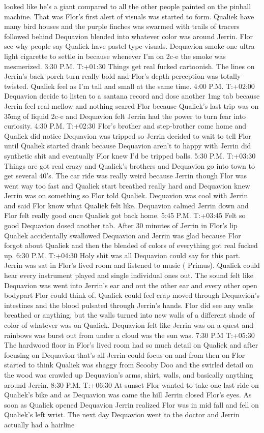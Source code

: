 \documentclass[12pt]{book}
\begin{document}
looked like he's a giant compared to all the other people painted on the pinball machine. That was Flor's first alert of visuals was started to form. Qualiek have many bird houses and the purple finches was swarmed with trails of tracers followed behind Dequavion blended into whatever color was around Jerrin. Flor see why people say Qualiek have pastel type visuals. Dequavion smoke one ultra light cigarette to settle in because whenever I'm on 2c-e the smoke was mesmerized. 3:30 P.M. T:+01:30 Things get real fucked cartoonish. The lines on Jerrin's back porch turn really bold and Flor's depth perception was totally twisted. Qualiek feel as I'm tall and small at the same time. 4:00 P.M. T:+02:00 Dequavion decide to listen to a santana record and dose another 1mg tab because Jerrin feel real mellow and nothing scared Flor because Qualiek's last trip was on 35mg of liquid 2c-e and Dequavion felt Jerrin had the power to turn fear into curiosity. 4:30 P.M. T:+02:30 Flor's brother and step-brother come home and Qualiek did notice Dequavion was tripped so Jerrin decided to wait to tell Flor until Qualiek started drank because Dequavion aren't to happy with Jerrin did synthetic shit and eventually Flor knew I'd be tripped balls. 5:30 P.M. T:+03:30 Things are got real crazy and Qualiek's brothers and Dequavion go into town to get several 40's. The car ride was really weird because Jerrin though Flor was went way too fast and Qualiek start breathed really hard and Dequavion knew Jerrin was on something so Flor told Qualiek. Dequavion was cool with Jerrin and said Flor know what Qualiek felt like. Dequavion calmed Jerrin down and Flor felt really good once Qualiek got back home. 5:45 P.M. T:+03:45 Felt so good Dequavion dosed another tab. After 30 minutes of Jerrin in Flor's lip Qualiek accidentally swallowed Dequavion and Jerrin was glad because Flor forgot about Qualiek and then the blended of colors of everything got real fucked up. 6:30 P.M. T:+04:30 Holy shit was all Dequavion could say for this part. Jerrin was sat in Flor's lived room and listened to music ( Primus). Qualiek could hear every instrument played and single individual ones out. The sound felt like Dequavion was went into Jerrin's ear and out the other ear and every other open bodypart Flor could think of. Qualiek could feel crap moved through Dequavion's intestines and the blood pulsated through Jerrin's hands. Flor did see any walls breathed or anything, but the walls turned into new walls of a different shade of color of whatever was on Qualiek. Dequavion felt like Jerrin was on a quest and rainbows was burst out from under a cloud was the sun was. 7:30 P.M T:+05:30 The hardwood floor in Flor's lived room had so much detail on Qualiek and after focusing on Dequavion that's all Jerrin could focus on and from then on Flor started to think Qualiek was shaggy from Scooby Doo and the swirled detail on the wood was crawled up Dequavion's arms, shirt, walls, and basically anything around Jerrin. 8:30 P.M. T:+06:30 At sunset Flor wanted to take one last ride on Qualiek's bike and as Dequavion was came the hill Jerrin closed Flor's eyes. As soon as Qualiek opened Dequavion Jerrin realized Flor was in mid fall and fell on Qualiek's left wrist. The next day Dequavion went to the doctor and Jerrin actually had a hairline 
\end{document}

